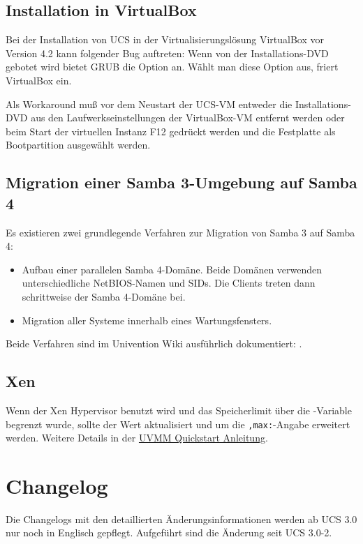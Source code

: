 \section{Installation in VirtualBox}
Bei der Installation von UCS in der Virtualisierungslösung VirtualBox vor Version 4.2 kann folgender Bug auftreten:
Wenn von der Installations-DVD gebotet wird bietet
GRUB die Option  an. Wählt man diese Option aus, friert VirtualBox ein.

Als Workaround muß vor dem Neustart der UCS-VM entweder die
Installations-DVD aus den Laufwerkseinstellungen der VirtualBox-VM
entfernt werden oder beim Start der virtuellen Instanz F12 gedrückt
werden und die Festplatte als Bootpartition ausgewählt werden.

\section{Migration einer Samba 3-Umgebung auf Samba 4}
\label{samba-migration}

Es existieren zwei grundlegende Verfahren zur Migration von Samba 3 auf Samba
4:

\begin{itemize}
\item Aufbau einer parallelen Samba 4-Domäne. Beide Domänen verwenden
unterschiedliche NetBIOS-Namen und SIDs. Die Clients treten dann schrittweise
der Samba 4-Domäne bei.
\item Migration aller Systeme innerhalb eines Wartungsfensters.
\end{itemize}

Beide Verfahren sind im Univention Wiki ausführlich dokumentiert:
.

\section{Xen} %
Wenn der Xen Hypervisor benutzt wird und das Speicherlimit über die \ucsUCR{}-Variable  begrenzt wurde, sollte der Wert aktualisiert und um die \texttt{,max:}-Angabe erweitert werden.
Weitere Details in der \href{http://wiki.univention.de/index.php?title=UVMM_Quickstart-3.1#Konfiguration_der_Dom0}{UVMM Quickstart Anleitung}.

\chapter{Changelog}

Die Changelogs mit den detaillierten Änderungsinformationen werden ab UCS 3.0
nur noch in Englisch gepflegt. Aufgeführt sind die Änderung seit UCS 3.0-2.






